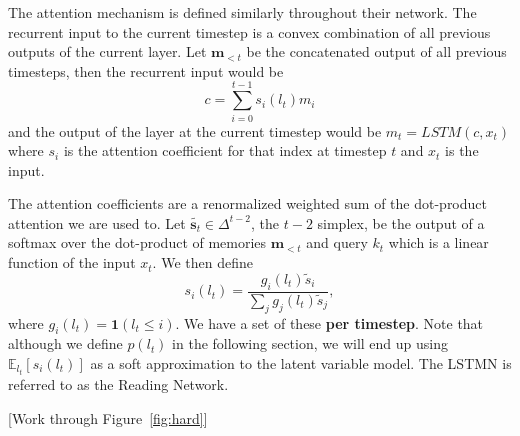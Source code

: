 \documentclass{article}
\newcommand\Es[2]{\mathbb{E}_{#1}\left[#2\right]}
\begin{document}
The attention mechanism is defined similarly throughout their network.
The recurrent input to the current timestep is a convex combination of
all previous outputs of the current layer.
Let $\bm{m}_{<t}$ be the concatenated output of all previous timesteps,
then the recurrent input would be
\begin{equation}c = \sum_{i=0}^{t-1} s_i(l_t) m_i\end{equation}
and the output of the layer at the current timestep would be
$m_t = LSTM(c, x_t)$ where $s_i$ is the attention coefficient
for that index at timestep $t$ and $x_t$ is the input.

The attention coefficients are a renormalized weighted sum of
the dot-product attention we are used to.
Let $\tilde{\bm{s}_t}\in\Delta^{t-2}$, the $t-2$ simplex, be the output of a softmax over
the dot-product of memories $\bm{m}_{<t}$ and query $k_t$
which is a linear function of the input $x_t$.
We then define
\begin{equation}s_i(l_t) = \frac{g_i(l_t)\tilde{s}_i}{\sum_jg_j(l_t)\tilde{s}_j},\end{equation}
where $g_i(l_t) = \mathbf{1}(l_t \le i)$.
We have a set of these \textbf{per timestep}.
Note that although we define $p(l_t)$ in the following section,
we will end up using $\Es{l_t}{s_i(l_t)}$ as a soft approximation to the
latent variable model.
The LSTMN is referred to as the Reading Network.

[Work through Figure~\ref{fig:hard}]
\end{document}

